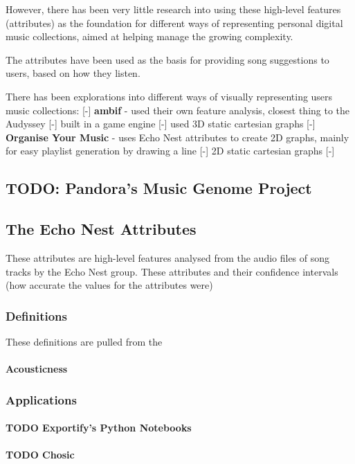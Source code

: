 However, there has been very little research into using these high-level features (attributes) as the foundation for different ways of representing personal digital music collections, aimed at helping manage the growing complexity.

The attributes have been used as the basis for providing song suggestions to users, based on how they listen.

There has been explorations into different ways of visually representing users music collections:
[-] \textbf{ambif} - used their own feature analysis, closest thing to the Audyssey
    [-] built in a game engine
    [-] used 3D static cartesian graphs
[-] \textbf{Organise Your Music} - uses Echo Nest attributes to create 2D graphs, mainly for easy playlist generation by drawing a line
    [-] 2D static cartesian graphs
[-] \textbf{}

\subsection{TODO: Pandora's Music Genome Project}

\subsection{The Echo Nest Attributes}
These attributes are high-level features analysed from the audio files of song tracks by the Echo Nest group. These attributes and their confidence intervals (how accurate the values for the attributes were)



\subsubsection{Definitions}
These definitions are pulled from the 
\paragraph{Acousticness} 

\subsubsection{Applications}

\paragraph{TODO Exportify's Python Notebooks}

\paragraph{TODO Chosic}
